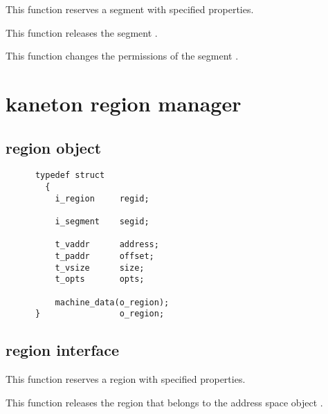 	 {
	   This function reserves a segment with specified properties.
	 }

	 {
	   This function releases the segment .
	 }

	 {
	   This function changes the permissions of the segment .
	 }

\section{kaneton region manager}

\subsection*{region object}

\begin{verbatim}
      typedef struct
        {
          i_region     regid;

          i_segment    segid;

          t_vaddr      address;
          t_paddr      offset;
          t_vsize      size;
          t_opts       opts;

          machine_data(o_region);
      }                o_region;
\end{verbatim}

\subsection*{region interface}

	 {
	   This function reserves a region with specified properties.
	 }

	 {
	   This function releases the region  that belongs
	   to the address space object .
	 }


